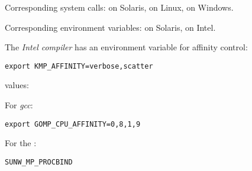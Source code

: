 Corresponding system calls:  on Solaris,
 on Linux,
 on Windows.

Corresponding environment variables:  on
Solaris,  on Intel.

The \emph{Intel compiler} has an
environment variable for affinity control:
\begin{verbatim}
export KMP_AFFINITY=verbose,scatter
\end{verbatim}
values: 

For \emph{gcc}:
\begin{verbatim}
export GOMP_CPU_AFFINITY=0,8,1,9
\end{verbatim}

For the :
\begin{verbatim}
SUNW_MP_PROCBIND
\end{verbatim}

